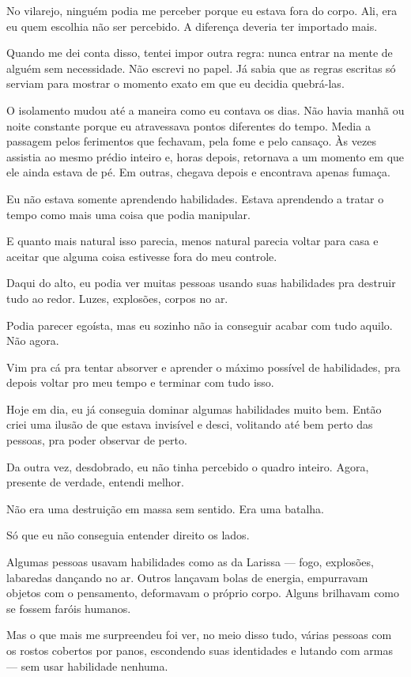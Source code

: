 No vilarejo, ninguém podia me perceber porque eu estava fora do corpo. Ali, era eu quem escolhia não ser percebido. A diferença deveria ter importado mais.

Quando me dei conta disso, tentei impor outra regra: nunca entrar na mente de alguém sem necessidade. Não escrevi no papel. Já sabia que as regras escritas só serviam para mostrar o momento exato em que eu decidia quebrá-las.

O isolamento mudou até a maneira como eu contava os dias. Não havia manhã ou noite constante porque eu atravessava pontos diferentes do tempo. Media a passagem pelos ferimentos que fechavam, pela fome e pelo cansaço. Às vezes assistia ao mesmo prédio inteiro e, horas depois, retornava a um momento em que ele ainda estava de pé. Em outras, chegava depois e encontrava apenas fumaça.

Eu não estava somente aprendendo habilidades. Estava aprendendo a tratar o tempo como mais uma coisa que podia manipular.

E quanto mais natural isso parecia, menos natural parecia voltar para casa e aceitar que alguma coisa estivesse fora do meu controle.

Daqui do alto, eu podia ver muitas pessoas usando suas habilidades pra destruir tudo ao redor.  
Luzes, explosões, corpos no ar.

Podia parecer egoísta, mas eu sozinho não ia conseguir acabar com tudo aquilo.  
Não agora.

Vim pra cá pra tentar absorver e aprender o máximo possível de habilidades, pra depois voltar pro meu tempo e terminar com tudo isso.

Hoje em dia, eu já conseguia dominar algumas habilidades muito bem.  
Então criei uma ilusão de que estava invisível e desci, volitando até bem perto das pessoas, pra poder observar de perto.

Da outra vez, desdobrado, eu não tinha percebido o quadro inteiro.  
Agora, presente de verdade, entendi melhor.

Não era uma destruição em massa sem sentido.  
Era uma batalha.

Só que eu não conseguia entender direito os lados.

Algumas pessoas usavam habilidades como as da Larissa — fogo, explosões, labaredas dançando no ar.  
Outros lançavam bolas de energia, empurravam objetos com o pensamento, deformavam o próprio corpo.  
Alguns brilhavam como se fossem faróis humanos.

Mas o que mais me surpreendeu foi ver, no meio disso tudo, várias pessoas com os rostos cobertos por panos, escondendo suas identidades e lutando com armas — sem usar habilidade nenhuma.


